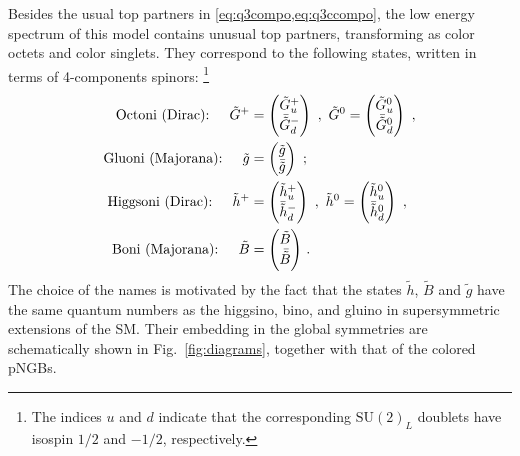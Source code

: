 \documentclass[preprintnumbers,nofootinbib,showpacs,eqsecnum,pre,12pt]{revtex4-1}
\newcommand{\SU}{\text{SU}}
\begin{document}
Besides the usual top partners in \cref{eq:q3compo,eq:q3ccompo}, the low energy spectrum of this model contains unusual top partners, transforming as color octets and color singlets. They correspond to the following states, written in terms of 4-components spinors:
\footnote{The indices $u$ and $d$ indicate that the corresponding $\SU(2)_L$ doublets have isospin $1/2$ and
$-1/2$, respectively.} 
\begin{subequations}\label{eq:hyperbaryonnames}
\begin{align}
\mbox{Octoni (Dirac): \hspace{10pt}} \tilde G^+ &= \begin{pmatrix} \tilde G^+_u \\ \bar{\tilde {G}}^-_d \end{pmatrix} \,\,,\,\,
\tilde G^0 = \begin{pmatrix} \tilde G^0_u \\ \bar{\tilde {G}}^0_d \end{pmatrix}\,\,, \\
\mbox{Gluoni (Majorana): \hspace{10pt}} \tilde g &= \begin{pmatrix} \tilde g \\ \bar{\tilde{g}} \end{pmatrix} \,\,; \\
\mbox{Higgsoni (Dirac): \hspace{10pt}}\tilde h^+ &= \begin{pmatrix} \tilde h^+_u \\ \bar{\tilde{h}}^-_d \end{pmatrix} \,\,,\,\,
\tilde h^0 = \begin{pmatrix} \tilde h^0_u \\ \bar{\tilde{h}}^0_d \end{pmatrix} \,\,, \\
\mbox{Boni (Majorana): \hspace{10pt}}\tilde B &= \begin{pmatrix} {\tilde B} \\ \bar{\tilde{B}} \end{pmatrix} \,.
\end{align}
\end{subequations}
The choice of the names is motivated by the fact that the states $\tilde h$, $\tilde B$ and $\tilde g$ have the same
quantum numbers as the higgsino, bino, and gluino in supersymmetric extensions of the SM.
Their embedding in the global symmetries are schematically shown in Fig.~\ref{fig:diagrams}, together with that of the colored pNGBs.
\end{document}
